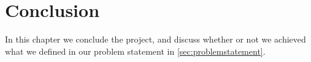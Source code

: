 \chapter{Conclusion}
In this chapter we conclude the project, and discuss whether or not we achieved what we defined in our problem statement in \autoref{sec:problemstatement}.